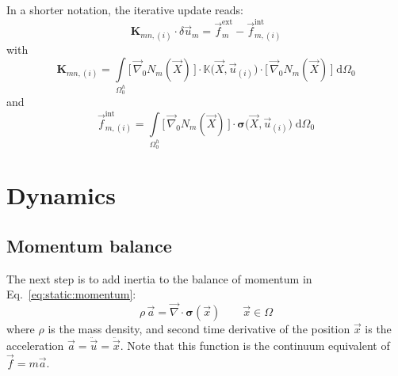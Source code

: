 \documentclass[times,namecite]{goose-article}
\begin{document}
In a shorter notation, the iterative update reads:
\begin{equation}
  \bm{K}_{mn,(i)} \cdot \delta \vec{u}_m
  =
  \vec{f}_m^\mathrm{ext}
  -
  \vec{f}_{m,(i)}^\mathrm{int}
\end{equation}
with
\begin{equation}
  \bm{K}_{mn,(i)}
  =
  \int\limits_{\Omega^h_0}
    \big[\, \vec{\nabla}_0 N_m(\vec{X}) \,\big]
    \cdot
    \mathbb{K}\big(\vec{X}, \vec{u}_{(i)}\big)
    \cdot
    \big[\, \vec{\nabla}_0 N_m(\vec{X}) \,\big] \;
  \mathrm{d}\Omega_0
\end{equation}
and
\begin{equation}
  \vec{f}_{m,(i)}^\mathrm{int}
  =
  \int\limits_{\Omega^h_0}
    \big[\, \vec{\nabla}_0 N_m(\vec{X}) \,\big]
    \cdot
    \bm{\sigma}\big(\vec{X}, \vec{u}_{(i)}\big) \;
  \mathrm{d}\Omega_0
\end{equation}

\section{Dynamics}

\subsection{Momentum balance}

The next step is to add inertia to the balance of momentum in Eq.~\eqref{eq:static:momentum}:
\begin{equation}
  \rho\, \vec{a}
  =
  \vec{\nabla} \cdot
  \bm{\sigma}(\vec{x})
  \qquad
  \vec{x} \in \Omega
\end{equation}
where $\rho$ is the mass density, and second time derivative of the position $\vec{x}$ is the acceleration $\vec{a} = \ddot{\vec{u}} = \ddot{\vec{x}}$. Note that this function is the continuum equivalent of $\vec{f} = m \vec{a}$.
\end{document}

